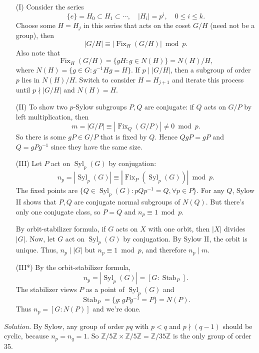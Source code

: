 \documentclass{mathproblems}
\newcommand\Z{\mathbb{Z}}
\begin{document}
\begin{questions}
{\color{teal}
\begin{itemize}
\item[(I)] Consider the series
$$
\{e\}=H_0\subset H_1\subset \cdots, \quad |H_i|=p^i,\quad 0\leq i\leq k.
$$
Choose some $H=H_j$ in this series that acts on the coset $G/H$ (need not be a group), then
$$
|G/H|\equiv |\operatorname{Fix}_H(G/H)|\bmod p.
$$
Also note that 
$$
\operatorname{Fix}_H(G/H)=\{gH:g\in N(H)\}=N(H)/H,
$$
where $N(H)=\{g\in G: g^{-1}Hg=H\}$. If $p\mid |G/H|$, then a subgroup of order $p$ lies in $N(H)/H$. Switch to consider $H=H_{j+1}$ and iterate this process until $p\nmid |G/H|$ and $N(H)=H$.

\item[(II)] To show two $p$-Sylow subgroups $P,Q$ are conjugate: if $Q$ acts on $G/P$ by left multiplication, then $$
m=|G/P|\equiv |\operatorname{Fix}_Q(G/P)| \neq 0 \bmod p.
$$
So there is some $gP\in G/P$ that is fixed by $Q$. Hence $QgP=gP$ and $Q=gPg^{-1}$ since they have the same size.

\item[(III)] Let $P$ act on $\operatorname{Syl}_p(G)$ by conjugation:
$$
n_p=|\operatorname{Syl}_p(G)|\equiv |\operatorname{Fix}_{P}(\operatorname{Syl}_p(G))| \bmod p.
$$
The fixed points are $\{Q\in \operatorname{Syl}_p(G): pQp^{-1}=Q,\forall p\in P\}$. For any $Q$, Sylow II shows that $P,Q$ are conjugate normal subgroups of $N(Q)$. But there's only one conjugate class, so $P=Q$ and $n_p\equiv 1\bmod p$. 

By orbit-stabilizer formula, if $G$ acts on $X$ with one orbit, then $|X|$ divides $|G|$. Now, let $G$ act on $\operatorname{Syl}_p(G)$ by conjugation. By Sylow II, the orbit is unique. Thus, $n_p\mid |G|$ but $n_p\equiv 1\bmod p$, and therefore $n_p\mid m$.

\item[(III*)] By the orbit-stabilizer formula,
$$
n_p=|\operatorname{Syl}_p(G)|=[G:\operatorname{Stab}_{P}].
$$
The stabilizer views $P$ as a point of $\operatorname{Syl}_p(G)$ and 
$$
\operatorname{Stab}_{P}=\{g:gPg^{-1}=P\}=N(P).
$$
Thus $n_p=[G:N(P)]$ and we're done.
\end{itemize}
}


\textit{Solution.}
By Sylow, any group of order $p q$ with $p<q$ and $p\nmid (q-1)$ should be cyclic, because $n_p=n_q=1$. So $\Z/5\Z \times \Z/5\Z = \Z/35\Z$ is the only group of order 35.



\end{questions}
\end{document}
